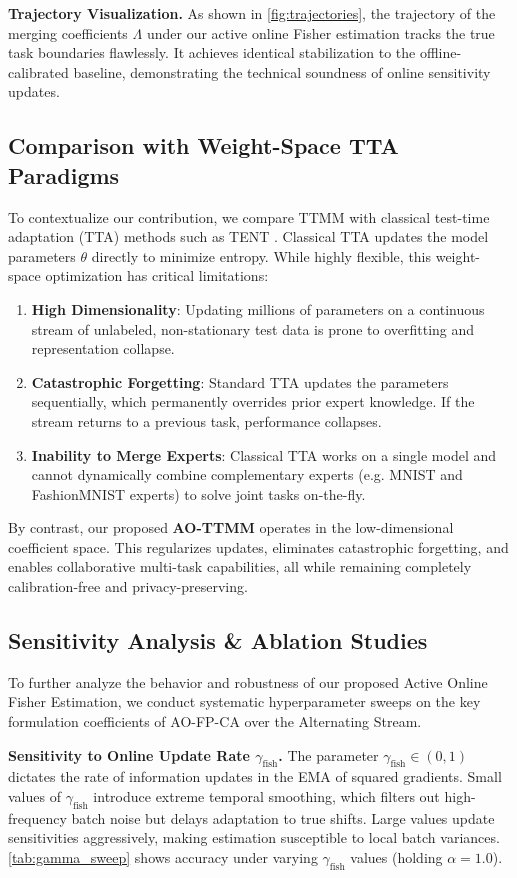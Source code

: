 \documentclass{article}
\theoremstyle{plain}
\theoremstyle{definition}
\begin{document}
\textbf{Trajectory Visualization.}
As shown in \cref{fig:trajectories}, the trajectory of the merging coefficients $\Lambda$ under our active online Fisher estimation tracks the true task boundaries flawlessly. It achieves identical stabilization to the offline-calibrated baseline, demonstrating the technical soundness of online sensitivity updates.

\subsection{Comparison with Weight-Space TTA Paradigms}
To contextualize our contribution, we compare TTMM with classical test-time adaptation (TTA) methods such as TENT \cite{tent}. Classical TTA updates the model parameters $\theta$ directly to minimize entropy. While highly flexible, this weight-space optimization has critical limitations:
\begin{enumerate}
    \item \textbf{High Dimensionality}: Updating millions of parameters on a continuous stream of unlabeled, non-stationary test data is prone to overfitting and representation collapse.
    \item \textbf{Catastrophic Forgetting}: Standard TTA updates the parameters sequentially, which permanently overrides prior expert knowledge. If the stream returns to a previous task, performance collapses.
    \item \textbf{Inability to Merge Experts}: Classical TTA works on a single model and cannot dynamically combine complementary experts (e.g. MNIST and FashionMNIST experts) to solve joint tasks on-the-fly.
\end{enumerate}
By contrast, our proposed \textbf{AO-TTMM} operates in the low-dimensional coefficient space. This regularizes updates, eliminates catastrophic forgetting, and enables collaborative multi-task capabilities, all while remaining completely calibration-free and privacy-preserving.

\subsection{Sensitivity Analysis \& Ablation Studies}
To further analyze the behavior and robustness of our proposed Active Online Fisher Estimation, we conduct systematic hyperparameter sweeps on the key formulation coefficients of AO-FP-CA over the Alternating Stream.

\textbf{Sensitivity to Online Update Rate $\gamma_{\text{fish}}$.}
The parameter $\gamma_{\text{fish}} \in (0,1)$ dictates the rate of information updates in the EMA of squared gradients. Small values of $\gamma_{\text{fish}}$ introduce extreme temporal smoothing, which filters out high-frequency batch noise but delays adaptation to true shifts. Large values update sensitivities aggressively, making estimation susceptible to local batch variances. \cref{tab:gamma_sweep} shows accuracy under varying $\gamma_{\text{fish}}$ values (holding $\alpha = 1.0$).
\end{document}

